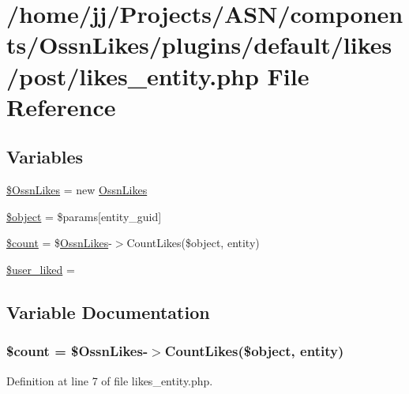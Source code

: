 \hypertarget{likes__entity_8php}{}\section{/home/jj/\+Projects/\+A\+S\+N/components/\+Ossn\+Likes/plugins/default/likes/post/likes\+\_\+entity.php File Reference}
\label{likes__entity_8php}
\subsection*{Variables}
\begin{DoxyCompactItemize}
\item 
\hyperlink{likes__entity_8php_a227f36ff099a95468945a2fabc5c0782}{\$\+Ossn\+Likes} = new \hyperlink{class_ossn_likes}{Ossn\+Likes}
\item 
\hyperlink{likes__entity_8php_a52123b83a1952a68c5513e47d59ec4a6}{\$object} = \$params\mbox{[}\textquotesingle{}entity\+\_\+guid\textquotesingle{}\mbox{]}
\item 
\hyperlink{likes__entity_8php_af789423037bbc89dc7c850e761177570}{\$count} = \$\hyperlink{class_ossn_likes}{Ossn\+Likes}-\/$>$Count\+Likes(\$object, \textquotesingle{}entity\textquotesingle{})
\item 
\hyperlink{likes__entity_8php_a91d2960279c9a814ff24b9107b342bf5}{\$user\+\_\+liked} = \textquotesingle{}\textquotesingle{}
\end{DoxyCompactItemize}


\subsection{Variable Documentation}
\subsubsection[{\texorpdfstring{\$count}{$count}}]{\setlength{\rightskip}{0pt plus 5cm}\${\bf count} = \${\bf Ossn\+Likes}-\/$>$Count\+Likes(\$object, \textquotesingle{}entity\textquotesingle{})}\hypertarget{likes__entity_8php_af789423037bbc89dc7c850e761177570}{}\label{likes__entity_8php_af789423037bbc89dc7c850e761177570}


Definition at line 7 of file likes\+\_\+entity.\+php.

